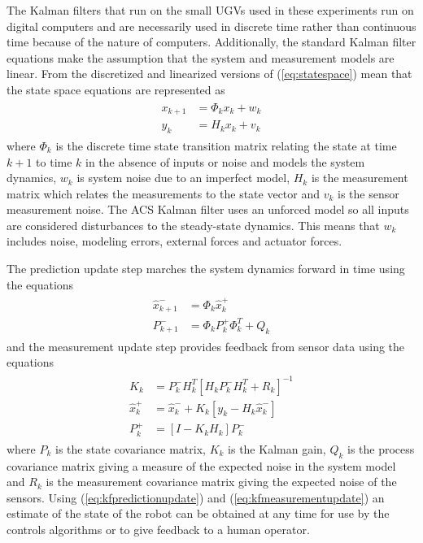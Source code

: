 The Kalman filters that run on the small UGVs used in these experiments run on digital computers and are necessarily used in discrete time rather than continuous time because of the nature of computers. Additionally, the standard Kalman filter equations make the assumption that the system and measurement models are linear. From \cite{Kelly_1994_338, Simon06OptimalEstimation} the discretized and linearized versions of (\ref{eq:statespace}) mean that the state space equations are represented as
\begin{align*}
\begin{split}
x_{k+1} &= \Phi_kx_k + w_k \\
y_k &= H_kx_k + v_k
\end{split}
\end{align*}
where $\Phi_k$ is the discrete time state transition matrix relating the state at time $k+1$ to time $k$ in the absence of inputs or noise and models the system dynamics, $w_k$ is system noise due to an imperfect model, $H_k$ is the measurement matrix which relates the measurements to the state vector and $v_k$ is the sensor measurement noise. The ACS Kalman filter uses an unforced model so all inputs are considered disturbances to the steady-state dynamics. This means that $w_k$ includes noise, modeling errors, external forces and actuator forces.

The prediction update step marches the system dynamics forward in time using the equations
\begin{align}
\label{eq:kfpredictionupdate}
\begin{split}
\hat{x}_{k+1}^- &= \Phi_k\hat{x}_k^+ \\
P_{k+1}^- &= \Phi_kP_k^+\Phi_k^T + Q_k
\end{split}
\end{align}
and the measurement update step provides feedback from sensor data using the equations
\begin{align}
\label{eq:kfmeasurementupdate}
\begin{split}
K_k &= P_k^-H_k^T\left[H_kP_k^-H_k^T + R_k\right]^{-1} \\
\hat{x}_k^+ &= \hat{x}_k^- + K_k\left[y_k - H_k\hat{x}_k^-\right] \\
P_k^+ &= \left[I - K_kH_k\right]P_k^-
\end{split}
\end{align}
where $P_k$ is the state covariance matrix, $K_k$ is the Kalman gain, $Q_k$ is the process covariance matrix giving a measure of the expected noise in the system model and $R_k$ is the measurement covariance matrix giving the expected noise of the sensors. Using (\ref{eq:kfpredictionupdate}) and (\ref{eq:kfmeasurementupdate}) an estimate of the state of the robot can be obtained at any time for use by the controls algorithms or to give feedback to a human operator.

